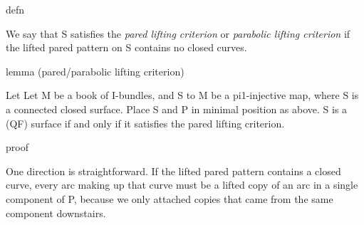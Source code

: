 defn

We say that S satisfies the \emph{pared lifting criterion} or \emph{parabolic
lifting criterion} if the lifted pared pattern on S contains no closed curves.

lemma (pared/parabolic lifting criterion)

Let Let M be a book of I-bundles, and S to M be a pi1-injective map, where S is
a connected closed surface.  Place S and P in minimal position as above. S is
a (QF) surface if and only if it satisfies the pared lifting criterion.

proof

One direction is straightforward. If the lifted pared pattern contains a closed
curve, every arc making up that curve must be a lifted copy of an arc in
a single component of P, because we only attached copies that came from the
same component downstairs. %


